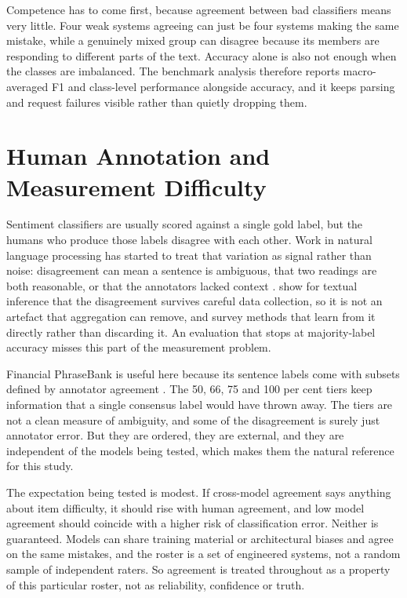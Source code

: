 \documentclass[11pt,a4paper,oneside]{book}
\let\textcite\citet
\let\Textcite\Citet
\let\parencite\citep
\begin{document}
Competence has to come first, because agreement between bad classifiers means very little.
Four weak systems agreeing can just be four systems making the same mistake, while a genuinely mixed group can disagree because its members are responding to different parts of the text.
Accuracy alone is also not enough when the classes are imbalanced.
The benchmark analysis therefore reports macro-averaged F1 and class-level performance alongside accuracy, and it keeps parsing and request failures visible rather than quietly dropping them.

\section{Human Annotation and Measurement Difficulty}
\label{sec:lit-human-agreement}

Sentiment classifiers are usually scored against a single gold label, but the humans who produce those labels disagree with each other.
Work in natural language processing has started to treat that variation as signal rather than noise: disagreement can mean a sentence is ambiguous, that two readings are both reasonable, or that the annotators lacked context \parencite{plank2022variation}.
\Textcite{pavlick2019inherent} show for textual inference that the disagreement survives careful data collection, so it is not an artefact that aggregation can remove, and \textcite{uma2021disagreement} survey methods that learn from it directly rather than discarding it.
An evaluation that stops at majority-label accuracy misses this part of the measurement problem.

Financial PhraseBank is useful here because its sentence labels come with subsets defined by annotator agreement \parencite{malo2014phrasebank}.
The 50, 66, 75 and 100 per cent tiers keep information that a single consensus label would have thrown away.
The tiers are not a clean measure of ambiguity, and some of the disagreement is surely just annotator error.
But they are ordered, they are external, and they are independent of the models being tested, which makes them the natural reference for this study.

The expectation being tested is modest.
If cross-model agreement says anything about item difficulty, it should rise with human agreement, and low model agreement should coincide with a higher risk of classification error.
Neither is guaranteed.
Models can share training material or architectural biases and agree on the same mistakes, and the roster is a set of engineered systems, not a random sample of independent raters.
So agreement is treated throughout as a property of this particular roster, not as reliability, confidence or truth.
\end{document}
